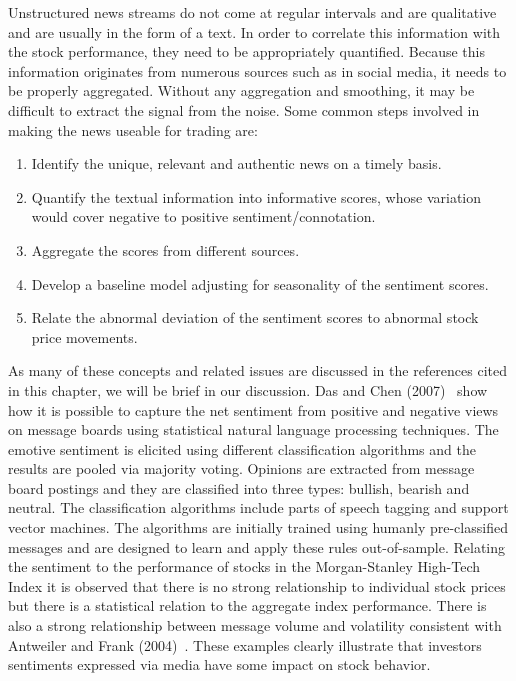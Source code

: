 Unstructured news streams do not come at regular intervals and are qualitative and are usually in the form of a text. In order to correlate this information with the stock performance, they need to be appropriately quantified. Because this information originates from numerous sources such as in social media, it needs to be properly aggregated. Without any aggregation and smoothing, it may be difficult to extract the signal from the noise. Some common steps involved in making the news useable for trading are:
	\begin{enumerate}[--]
	\item Identify the unique, relevant and authentic news on a timely basis.
	\item Quantify the textual information into informative scores, whose variation would cover negative to positive sentiment/connotation.
	\item Aggregate the scores from different sources.
	\item Develop a baseline model adjusting for seasonality of the sentiment scores.
	\item Relate the abnormal deviation of the sentiment scores to abnormal stock price movements. 
	\end{enumerate}
As many of these concepts and related issues are discussed in the references cited in this chapter, we will be brief in our discussion. Das and Chen (2007)~\cite{daschen} show how it is possible to capture the net sentiment from positive and negative views on message boards using statistical natural language processing techniques. The emotive sentiment is elicited using different classification algorithms and the results are pooled via majority voting. Opinions are extracted from message board postings and they are classified into three types: bullish, bearish and neutral. The classification algorithms include parts of speech tagging and support vector machines. The algorithms are initially trained using humanly pre-classified messages and are designed to learn and apply these rules out-of-sample. Relating the sentiment to the performance of stocks in the Morgan-Stanley High-Tech Index it is observed that there is no strong relationship to individual stock prices but there is a statistical relation to the aggregate index performance. There is also a strong relationship between message volume and volatility consistent with Antweiler and Frank (2004)~\cite{antweiler2004all}. These examples clearly illustrate that investors sentiments expressed via media have some impact on stock behavior. 


